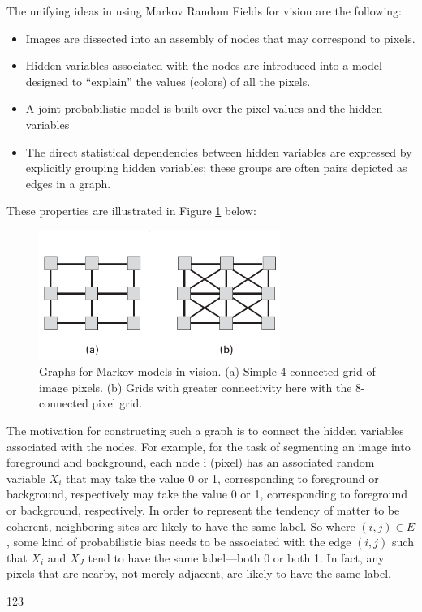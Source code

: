 The unifying ideas in using Markov Random Fields for vision are the following:
\begin{itemize}
	\item Images are dissected into an assembly of nodes that may correspond to pixels.
	\item Hidden variables associated with the nodes are introduced into a model designed to “explain” the values (colors) of all the pixels.
	\item  A joint probabilistic model is built over the pixel values and the hidden variables
	\item The direct statistical dependencies between hidden  variables are expressed by explicitly grouping hidden variables; these groups are often pairs depicted as edges in a graph.
\end{itemize}
These properties are illustrated in Figure \ref{fig:connectivity} below:
\begin{figure}[H]
	\centering
	\includegraphics[width=0.7\textwidth]{fig/Connectivity.PNG}
	\caption{Graphs for Markov models in vision. (a) Simple 4-connected grid of image pixels. (b) Grids with greater connectivity
		here with the 8-connected pixel grid.}
	\label{fig:connectivity}
\end{figure}

The motivation for constructing such a graph is to connect the hidden variables associated with the nodes. For example, for the task of segmenting an image into foreground and background, each node i (pixel) has an associated random variable $X_i$ that may take the value 0 or 1, corresponding to foreground or background, respectively may take the value 0 or 1, corresponding to foreground or background, respectively. In order to represent the tendency of matter to be coherent, neighboring sites are likely to have the same label. So where $(i, j) \in E$, some kind of probabilistic bias needs to be associated with the edge $(i,j)$ such that $X_i$ and $X_J$ tend to have the same label—both 0 or both 1. In fact, any pixels that are nearby, not merely adjacent, are likely to have the same label\cite{jezicagent}. 



123
